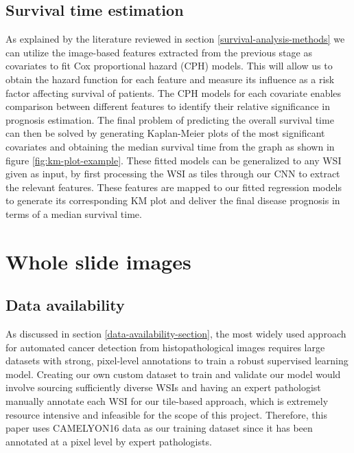 \documentclass{l4proj}
\begin{document}
\subsection{Survival time estimation}
As explained by the literature reviewed in section \ref{survival-analysis-methods} we can utilize the image-based features extracted from the previous stage as covariates to fit Cox proportional hazard (CPH) models. This will allow us to obtain the hazard function for each feature and measure its influence as a risk factor affecting survival of patients. The CPH models for each covariate enables comparison between different features to identify their relative significance in prognosis estimation. The final problem of predicting the overall survival time can then be solved by generating Kaplan-Meier plots of the most significant covariates and obtaining the median survival time from the graph as shown in figure \ref{fig:km-plot-example}. These fitted models can be generalized to any WSI given as input, by first processing the WSI as tiles through our CNN to extract the relevant features. These features are mapped to our fitted regression models to generate its corresponding KM plot and deliver the final disease prognosis in terms of a median survival time. 

\section{Whole slide images}
\subsection{Data availability}
As discussed in section \ref{data-availability-section}, the most widely used approach for automated cancer detection from histopathological images requires large datasets with strong, pixel-level annotations to train a robust supervised learning model. Creating our own custom dataset to train and validate our model would involve sourcing sufficiently diverse WSIs and having an expert pathologist manually annotate each WSI for our tile-based approach, which is extremely resource intensive and infeasible for the scope of this project. Therefore, this paper uses CAMELYON16 data as our training dataset since it has been annotated at a pixel level by expert pathologists.
\end{document}
